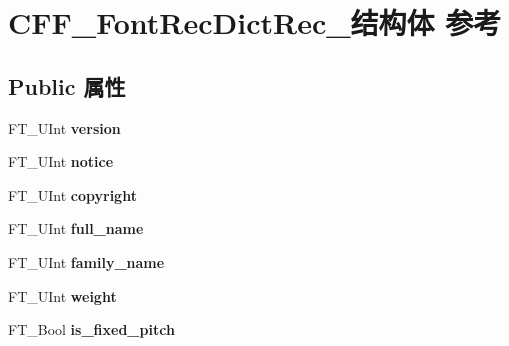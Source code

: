 \hypertarget{struct_c_f_f___font_rec_dict_rec__}{}\section{C\+F\+F\+\_\+\+Font\+Rec\+Dict\+Rec\+\_\+结构体 参考}
\label{struct_c_f_f___font_rec_dict_rec__}
\subsection*{Public 属性}
\begin{DoxyCompactItemize}
\item 
\mbox{\label{struct_c_f_f___font_rec_dict_rec___acf57a6671e52667f2ca56be173d2fbc4}} 
F\+T\+\_\+\+U\+Int {\bfseries version}
\item 
\mbox{\label{struct_c_f_f___font_rec_dict_rec___aa5ddff24415d30875ca78e6628454edf}} 
F\+T\+\_\+\+U\+Int {\bfseries notice}
\item 
\mbox{\label{struct_c_f_f___font_rec_dict_rec___ad3b74ad094c4c3ab46e44f1c8674cb53}} 
F\+T\+\_\+\+U\+Int {\bfseries copyright}
\item 
\mbox{\label{struct_c_f_f___font_rec_dict_rec___a2d2eb2abfb02cb68f84f6892607ae4a6}} 
F\+T\+\_\+\+U\+Int {\bfseries full\+\_\+name}
\item 
\mbox{\label{struct_c_f_f___font_rec_dict_rec___a19915c7a7236a7e90fe63a26dee1d12d}} 
F\+T\+\_\+\+U\+Int {\bfseries family\+\_\+name}
\item 
\mbox{\label{struct_c_f_f___font_rec_dict_rec___a845a6eff94bd01b6abef438bd1442d39}} 
F\+T\+\_\+\+U\+Int {\bfseries weight}
\item 
\mbox{\label{struct_c_f_f___font_rec_dict_rec___a73745a8bc80929918c0472127203e837}} 
F\+T\+\_\+\+Bool {\bfseries is\+\_\+fixed\+\_\+pitch}
\item 
\mbox{\label{struct_c_f_f___font_rec_dict_rec___afe7d2c26f6342e4c5b0117cf89075b68}} 

\end{DoxyCompactItemize}
